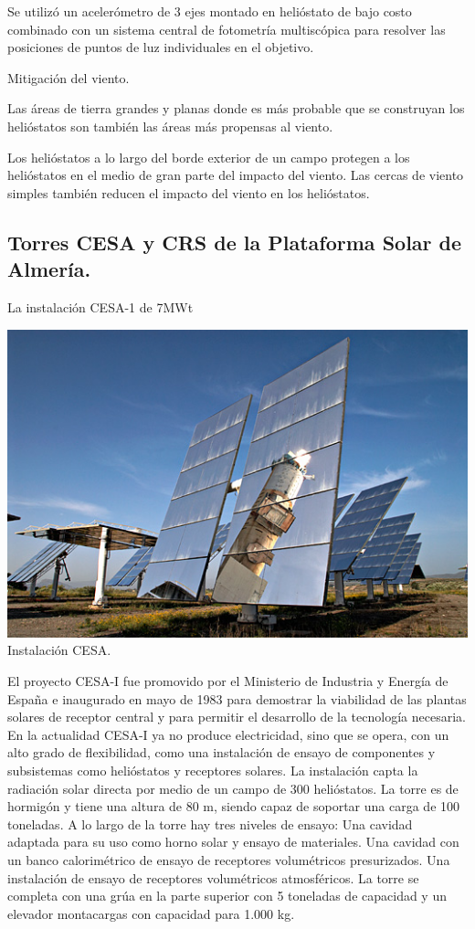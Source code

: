 Se utilizó un acelerómetro de 3 ejes montado en helióstato de bajo costo combinado con un sistema central de fotometría multiscópica para resolver las posiciones de puntos de luz individuales en el objetivo.

Mitigación del viento.

Las áreas de tierra grandes y planas donde es más probable que se construyan los helióstatos son también las áreas más propensas al viento.

Los helióstatos a lo largo del borde exterior de un campo protegen a los helióstatos en el medio de gran parte del impacto del viento. Las cercas de viento simples también reducen el impacto del viento en los helióstatos. \cite{GoogleWebSite}



\subsection{Torres CESA y CRS de la Plataforma Solar de Almería.}

La instalación CESA-1 de 7MWt

\includegraphics[scale=1]{unnamed (4).png}
Instalación CESA. \cite{PSA1WebSite}

El proyecto CESA-I fue promovido por el Ministerio de Industria y Energía de España e inaugurado en mayo de 1983 para demostrar la viabilidad de las plantas solares de receptor central y para permitir el desarrollo de la tecnología necesaria. En la actualidad CESA-I ya no produce electricidad, sino que se opera, con un alto grado de flexibilidad, como una instalación de ensayo de componentes y subsistemas como helióstatos y receptores solares.
La instalación capta la radiación solar directa por medio de un campo de 300 helióstatos.
La torre es de hormigón y tiene una altura de 80 m, siendo capaz de soportar una carga de 100 toneladas. A lo largo de la torre hay tres niveles de ensayo:
Una cavidad adaptada para su uso como horno solar y ensayo de materiales.
Una cavidad con un banco calorimétrico de ensayo de receptores volumétricos presurizados.
Una instalación de ensayo de receptores volumétricos atmosféricos.
La torre se completa con una grúa en la parte superior con 5 toneladas de capacidad y un elevador montacargas con capacidad para 1.000 kg. \cite{PSA3WebSite}




